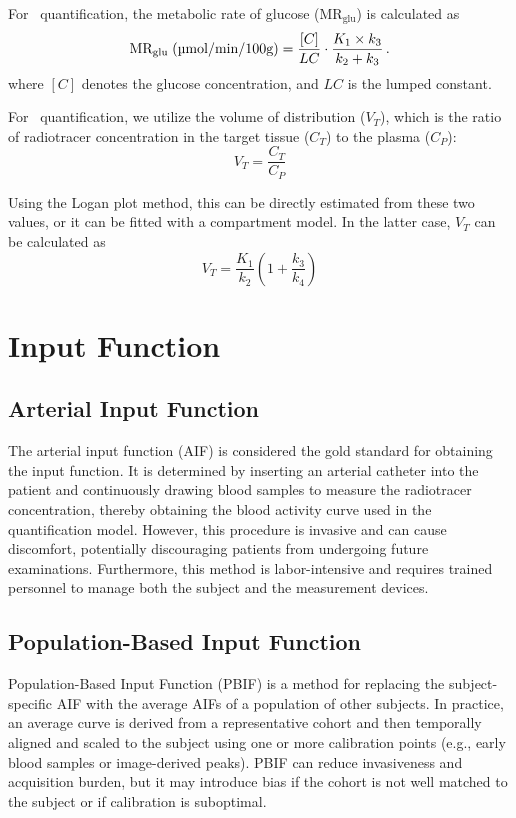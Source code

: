 For \fdg$\,$ quantification, the metabolic rate of glucose (\(\textrm{MR}_{\textrm{glu}}\)) is calculated as
\begin{equation}
	\textrm{MR}_{\textrm{glu}} \; (\textrm{\textmu mol/min/100g}) = \frac{[C]}{LC} \cdot \frac{K_1 \times k_3}{k_2 + k_3} \,.
\end{equation}
where \([C]\) denotes the glucose concentration, and \(LC\) is the lumped constant.

For \yohimbine\ quantification, we utilize the volume of distribution ($V_T$), which is the ratio of radiotracer concentration in the target tissue ($C_T$) to the plasma ($C_P$):
\[
	V_T = \frac{C_T}{C_P}
\]

Using the Logan plot method, this can be directly estimated from these two values, or it can be fitted with a compartment model.
In the latter case, $V_T$ can be calculated as
\[
	V_T = \frac{K_1}{k_2} (1+\frac{k_3}{k_4})
\]

\section{Input Function}

\subsection{Arterial Input Function}
The arterial input function (AIF) is considered the gold standard for obtaining the input function.
It is determined by inserting an arterial catheter into the patient and continuously drawing blood samples to measure the radiotracer concentration, thereby obtaining the blood activity curve used in the quantification model.
However, this procedure is invasive and can cause discomfort, potentially discouraging patients from undergoing future examinations.
Furthermore, this method is labor-intensive and requires trained personnel to manage both the subject and the measurement devices.

\subsection{Population-Based Input Function}
Population-Based Input Function (PBIF) is a method for replacing the subject-specific AIF with the average AIFs of a population of other subjects.
In practice, an average curve is derived from a representative cohort and then temporally aligned and scaled to the subject using one or more calibration points (e.g., early blood samples or image-derived peaks).
PBIF can reduce invasiveness and acquisition burden, but it may introduce bias if the cohort is not well matched to the subject or if calibration is suboptimal.

